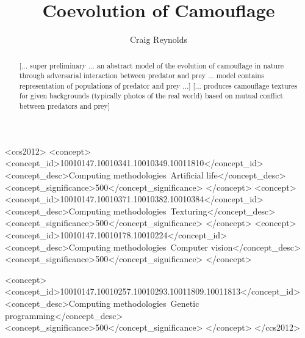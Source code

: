 \documentclass[sigconf]{acmart}
\begin{document}
\title{Coevolution of Camouflage}

\author{Craig Reynolds}

\renewcommand{\shortauthors}{Firstauthor et al.}

\begin{abstract}
  [... super preliminary ... an abstract model of the evolution of camouflage in nature through adversarial interaction between predator and prey ... model contains representation of populations of predator and prey ...]
  [... produces camouflage textures for given backgrounds (typically photos of the real world) based on mutual conflict between predators and prey]
\end{abstract}

\begin{CCSXML}
<ccs2012>
   <concept>
       <concept_id>10010147.10010341.10010349.10011810</concept_id>
       <concept_desc>Computing methodologies~Artificial life</concept_desc>
       <concept_significance>500</concept_significance>
       </concept>
   <concept>
       <concept_id>10010147.10010371.10010382.10010384</concept_id>
       <concept_desc>Computing methodologies~Texturing</concept_desc>
       <concept_significance>500</concept_significance>
       </concept>
   <concept>
       <concept_id>10010147.10010178.10010224</concept_id>
       <concept_desc>Computing methodologies~Computer vision</concept_desc>
       <concept_significance>500</concept_significance>
       </concept>
    
    <concept>
        <concept_id>10010147.10010257.10010293.10011809.10011813</concept_id>
        <concept_desc>Computing methodologies~Genetic programming</concept_desc>
        <concept_significance>500</concept_significance>
    </concept>
 </ccs2012>
\end{CCSXML}



\end{document}
